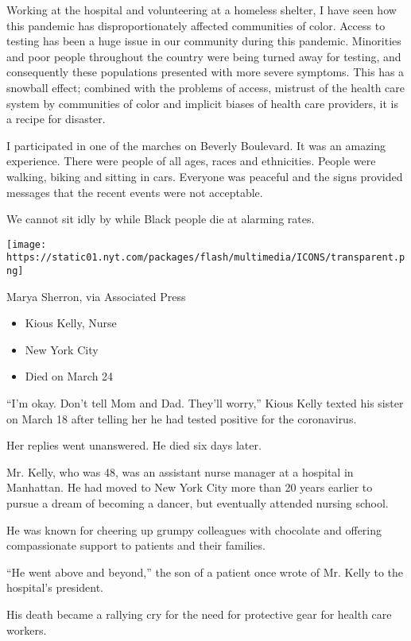 Working at the hospital and volunteering at a homeless shelter, I have
seen how this pandemic has disproportionately affected communities of
color. Access to testing has been a huge issue in our community during
this pandemic. Minorities and poor people throughout the country were
being turned away for testing, and consequently these populations
presented with more severe symptoms. This has a snowball effect;
combined with the problems of access, mistrust of the health care system
by communities of color and implicit biases of health care providers, it
is a recipe for disaster.

I participated in one of the marches on Beverly Boulevard. It was an
amazing experience. There were people of all ages, races and
ethnicities. People were walking, biking and sitting in cars. Everyone
was peaceful and the signs provided messages that the recent events were
not acceptable.

We cannot sit idly by while Black people die at alarming rates.

\texttt{[image: https://static01.nyt.com/packages/flash/multimedia/ICONS/transparent.png]}

Marya Sherron, via Associated Press

\begin{itemize}
\tightlist
\item
  Kious Kelly, Nurse
\item
  New York City
\item
  Died on March 24
\end{itemize}

``I'm okay. Don't tell Mom and Dad. They'll worry,'' Kious Kelly texted
his sister on March 18 after telling her he had tested positive for the
coronavirus.

Her replies went unanswered. He died six days later.

Mr. Kelly, who was 48, was an assistant nurse manager at a hospital in
Manhattan. He had moved to New York City more than 20 years earlier to
pursue a dream of becoming a dancer, but eventually attended nursing
school.

He was known for cheering up grumpy colleagues with chocolate and
offering compassionate support to patients and their families.

``He went above and beyond,'' the son of a patient once wrote of Mr.
Kelly to the hospital's president.

His death became a rallying cry for the need for protective gear for
health care workers.

